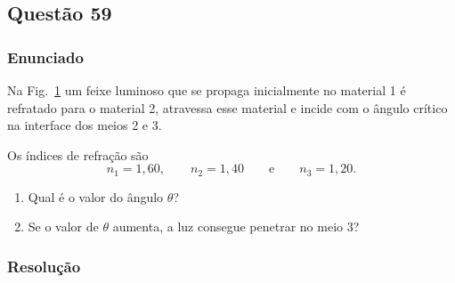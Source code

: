 \subsection{Questão 59}

\subsubsection{Enunciado}

Na Fig.~\ref{fig:33-59} um feixe luminoso que se propaga inicialmente no material 1 é refratado para o material 2, atravessa esse material e incide com o ângulo crítico na interface dos meios 2 e 3.

Os índices de refração são
\[
n_1 = 1{,}60,
\qquad
n_2 = 1{,}40
\qquad \text{e} \qquad
n_3 = 1{,}20.
\]

\begin{enumerate}
    \item[(a)] Qual é o valor do ângulo \(\theta\)?

    \item[(b)] Se o valor de \(\theta\) aumenta, a luz consegue penetrar no meio 3?
\end{enumerate}

\begin{figure}[h]
    \centering
    \label{fig:33-59}
\end{figure}


\subsubsection{Resolução}


\vspace{1cm}
